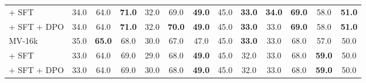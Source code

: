 \begin{table}[htbp]
\begin{tabular}{lcccccccccccc}
\quad + SFT & 34.0 & 64.0 & \textbf{71.0} & 32.0 & 69.0 & \textbf{49.0} & 45.0 & \textbf{33.0} & \textbf{34.0} & \textbf{69.0} & 58.0 & \textbf{51.0} \\
\quad + SFT + DPO & 34.0 & 64.0 & \textbf{71.0} & 32.0 & \textbf{70.0} & \textbf{49.0} & 45.0 & \textbf{33.0} & 33.0 & \textbf{69.0} & 58.0 & \textbf{51.0} \\
\midrule
\addlinespace[0.3em]
MV-16k & 35.0 & \textbf{65.0} & 68.0 & 30.0 & 67.0 & 47.0 & 45.0 & \textbf{33.0} & 33.0 & 68.0 & 57.0 & 50.0 \\
\quad + SFT & 33.0 & 64.0 & 69.0 & 29.0 & 68.0 & \textbf{49.0} & 45.0 & 32.0 & 33.0 & 68.0 & \textbf{59.0} & 50.0 \\
\quad + SFT + DPO & 33.0 & 64.0 & 69.0 & 30.0 & 68.0 & \textbf{49.0} & 45.0 & 32.0 & 33.0 & 68.0 & \textbf{59.0} & 50.0 \\
\bottomrule
\end{tabular}
\end{table}



